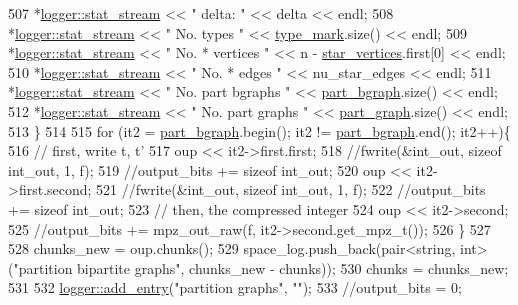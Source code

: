 \begin{DoxyCode}
507     *\hyperlink{classlogger_a7db37821f875f2ba3540980b355779f5}{logger::stat\_stream} << \textcolor{stringliteral}{" delta:            "} << delta << endl;
508     *\hyperlink{classlogger_a7db37821f875f2ba3540980b355779f5}{logger::stat\_stream} << \textcolor{stringliteral}{" No. types         "} << 
      \hyperlink{classmarked__graph__compressed_a86b00223525703e973415cbc9c94da68}{type\_mark}.size() << endl;
509     *\hyperlink{classlogger_a7db37821f875f2ba3540980b355779f5}{logger::stat\_stream} << \textcolor{stringliteral}{" No. * vertices    "} << n - 
      \hyperlink{classmarked__graph__compressed_a7a4ced4586e2e353f9076bd447df5208}{star\_vertices}.first[0] << endl;
510     *\hyperlink{classlogger_a7db37821f875f2ba3540980b355779f5}{logger::stat\_stream} << \textcolor{stringliteral}{" No. * edges       "} << nu\_star\_edges << endl;
511     *\hyperlink{classlogger_a7db37821f875f2ba3540980b355779f5}{logger::stat\_stream} << \textcolor{stringliteral}{" No. part bgraphs  "} << 
      \hyperlink{classmarked__graph__compressed_a7b3267063fba30b45eb21b3ba4e07536}{part\_bgraph}.size() << endl;
512     *\hyperlink{classlogger_a7db37821f875f2ba3540980b355779f5}{logger::stat\_stream} << \textcolor{stringliteral}{" No. part graphs   "} << 
      \hyperlink{classmarked__graph__compressed_ae179a4737e6eab905c18a94d44ef64b7}{part\_graph}.size() << endl;
513   \}
514 
515   \textcolor{keywordflow}{for} (it2 = \hyperlink{classmarked__graph__compressed_a7b3267063fba30b45eb21b3ba4e07536}{part\_bgraph}.begin(); it2 != \hyperlink{classmarked__graph__compressed_a7b3267063fba30b45eb21b3ba4e07536}{part\_bgraph}.end(); it2++)\{
516     \textcolor{comment}{// first, write t, t'}
517     oup << it2->first.first;
518     \textcolor{comment}{//fwrite(&int\_out, sizeof int\_out, 1, f);}
519     \textcolor{comment}{//output\_bits += sizeof int\_out;}
520     oup <<  it2->first.second;
521     \textcolor{comment}{//fwrite(&int\_out, sizeof int\_out, 1, f);}
522     \textcolor{comment}{//output\_bits += sizeof int\_out;}
523     \textcolor{comment}{// then, the compressed integer}
524     oup << it2->second;
525     \textcolor{comment}{//output\_bits += mpz\_out\_raw(f, it2->second.get\_mpz\_t());}
526   \}
527 
528   chunks\_new = oup.chunks();
529   space\_log.push\_back(pair<string, int> (\textcolor{stringliteral}{"partition bipartite graphs"}, chunks\_new - chunks));
530   chunks = chunks\_new;
531 
532   \hyperlink{classlogger_a710163deb17bc81f70d53d285b8ac9ac}{logger::add\_entry}(\textcolor{stringliteral}{"partition graphs"}, \textcolor{stringliteral}{""});
533   \textcolor{comment}{//output\_bits = 0;}

\end{DoxyCode}
